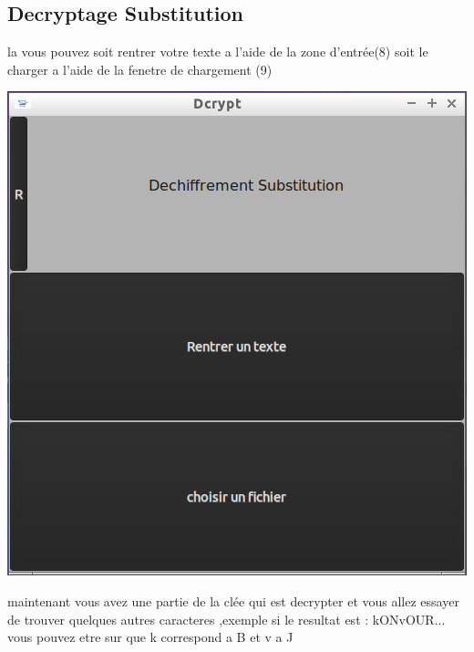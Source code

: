 \documentclass[a4]{article}
\begin{document}
		\subsection{Decryptage Substitution}
			la vous pouvez soit rentrer votre texte a l'aide de la zone d'entrée(8)
			soit le charger a l'aide de la fenetre de chargement (9)
			\begin{center}\includegraphics[scale=0.4]{10.png}\end{center}
			maintenant vous avez une partie de la clée qui est decrypter et vous allez 
			essayer de trouver quelques autres caracteres ,exemple si le resultat est :
			kONvOUR... vous pouvez etre sur que k correspond a B et v a J 
\end{document}
